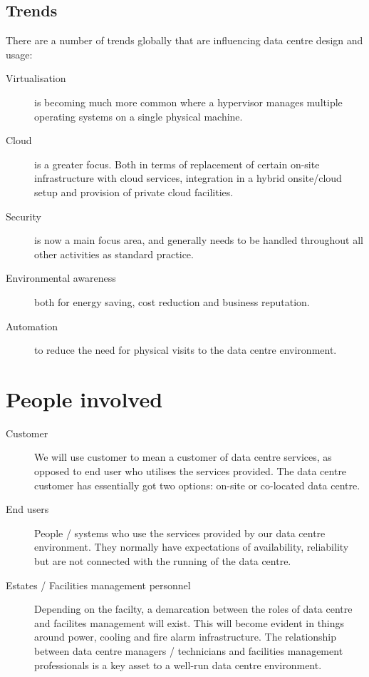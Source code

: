 \subsection{Trends}
\label{sec:trends}

There are a number of trends globally that are influencing data centre design and usage:
\begin{description}
\item[Virtualisation] is becoming much more common where a hypervisor manages multiple operating systems on a single physical machine. 
\item[Cloud] is a greater focus.  Both in terms of replacement of certain on-site infrastructure with cloud services, integration in a hybrid onsite/cloud setup and provision of private cloud facilities.
\item[Security] is now a main focus area, and generally needs to be handled throughout all other activities as standard practice.
\item[Environmental awareness] both for energy saving, cost reduction and business reputation. 
\item[Automation] to reduce the need for physical visits to the data centre environment.
\end{description}


\section{People involved}

\begin{description}
\item[Customer]
  We will use customer to mean a customer of data centre services, as opposed to end user who utilises the services provided.
  The data centre customer has essentially got two options: on-site or co-located data centre.
\item[End users]
  People / systems who use the services provided by our data centre environment.
  They normally have expectations of availability, reliability but are not connected with the running of the data centre.
\item[Estates / Facilities management personnel]
  Depending on the facilty, a demarcation between the roles of data centre and facilites management will exist.
  This will become evident in things around power, cooling and fire alarm infrastructure.
  The relationship between data centre managers / technicians and facilities management professionals is a key asset to a well-run data centre environment.
\end{description}
  
